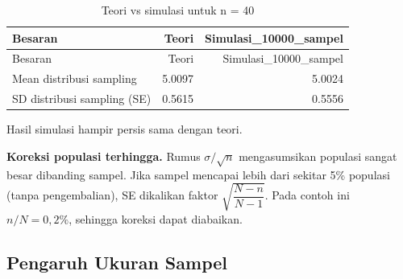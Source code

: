 \documentclass[
  indonesian,
  letterpaper,
]{book}
\begin{document}
\begin{longtable}[]{@{}lrr@{}}
\caption{Teori vs simulasi untuk n = 40}\tabularnewline
\toprule\noalign{}
Besaran & Teori & Simulasi\_10000\_sampel \\
\midrule\noalign{}
\endfirsthead
\toprule\noalign{}
Besaran & Teori & Simulasi\_10000\_sampel \\
\midrule\noalign{}
\endhead
\bottomrule\noalign{}
\endlastfoot
Mean distribusi sampling & 5.0097 & 5.0024 \\
SD distribusi sampling (SE) & 0.5615 & 0.5556 \\
\end{longtable}

Hasil simulasi hampir persis sama dengan teori.

\begin{tcolorbox}[enhanced jigsaw, arc=.35mm, bottomrule=.15mm, bottomtitle=1mm, breakable, colback=white, colbacktitle=quarto-callout-note-color!10!white, colframe=quarto-callout-note-color-frame, coltitle=black, left=2mm, leftrule=.75mm, opacityback=0, opacitybacktitle=0.6, rightrule=.15mm, title=\textcolor{quarto-callout-note-color}{\faInfo}\hspace{0.5em}{Catatan}, titlerule=0mm, toprule=.15mm, toptitle=1mm]

\textbf{Koreksi populasi terhingga.} Rumus \(\sigma/\sqrt{n}\)
mengasumsikan populasi sangat besar dibanding sampel. Jika sampel
mencapai lebih dari sekitar 5\% populasi (tanpa pengembalian), SE
dikalikan faktor \(\sqrt{\dfrac{N-n}{N-1}}\). Pada contoh ini
\(n/N = 0{,}2\%\), sehingga koreksi dapat diabaikan.

\end{tcolorbox}

\subsection{Pengaruh Ukuran Sampel}\label{pengaruh-ukuran-sampel}
\end{document}
